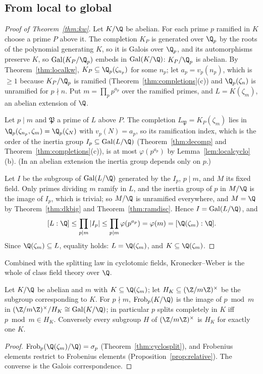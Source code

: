 \subsection*{From local to global}

\begin{proof}[Proof of Theorem~\ref{thm:kw}]
Let $K/\Q$ be abelian. For each prime $p$ ramified in $K$ choose a prime $P$ above it. The completion $K_P$ is generated over $\Q_p$ by the roots of the
polynomial generating $K$, so it is Galois over $\Q_p$, and its automorphisms preserve $K$, so $\operatorname{Gal}(K_P/\Q_p)$ embeds in
$\operatorname{Gal}(K/\Q)$: $K_P/\Q_p$ is abelian. By Theorem~\ref{thm:localkw}, $K_P\subseteq\Q_p(\zeta_{n_p})$ for some $n_p$; let $a_p=v_p(n_p)$, which is
$\ge1$ because $K_P/\Q_p$ is ramified (Theorem~\ref{thm:completions}(c)) and $\Q_p(\zeta_n)$ is unramified for $p\nmid n$. Put $m=\prod_pp^{a_p}$ over the
ramified primes, and $L=K(\zeta_m)$, an abelian extension of $\Q$.

Let $p\mid m$ and $\mathfrak P$ a prime of $L$ above $P$. The completion $L_{\mathfrak P}=K_P(\zeta_m)$ lies in $\Q_p(\zeta_{n_p},\zeta_m)=\Q_p(\zeta_N)$ with
$v_p(N)=a_p$, so its ramification index, which is the order of the inertia group $I_p\subseteq\operatorname{Gal}(L/\Q)$ (Theorem~\ref{thm:decomp} and
Theorem~\ref{thm:completions}(c)), is at most $\varphi(p^{a_p})$ by Lemma~\ref{lem:localcyclo}(b). (In an abelian extension the inertia group depends
only on $p$.)

Let $I$ be the subgroup of $\operatorname{Gal}(L/\Q)$ generated by the $I_p$, $p\mid m$, and $M$ its fixed field. Only primes dividing $m$ ramify in $L$, and the
inertia group of $p$ in $M/\Q$ is the image of $I_p$, which is trivial; so $M/\Q$ is unramified everywhere, and $M=\Q$ by Theorem~\ref{thm:dkbig} and
Theorem~\ref{thm:ramdisc}. Hence $I=\operatorname{Gal}(L/\Q)$, and
\[
[L:\Q]\le\prod_{p\mid m}|I_p|\le\prod_{p\mid m}\varphi(p^{a_p})=\varphi(m)=[\Q(\zeta_m):\Q].
\]
Since $\Q(\zeta_m)\subseteq L$, equality holds: $L=\Q(\zeta_m)$, and $K\subseteq\Q(\zeta_m)$.
\end{proof}

Combined with the splitting law in cyclotomic fields, Kronecker--Weber is the whole of class field theory over $\Q$.

\begin{corollary}\label{cor:cftQ}
Let $K/\Q$ be abelian and $m$ with $K\subseteq\Q(\zeta_m)$; let $H_K\subseteq(\Z/m\Z)^\times$ be the subgroup corresponding to $K$. For $p\nmid m$,
$\operatorname{Frob}_p(K/\Q)$ is the image of $p\bmod m$ in $(\Z/m\Z)^\times/H_K\cong\operatorname{Gal}(K/\Q)$; in particular $p$ splits completely in $K$ iff
$p\bmod m\in H_K$. Conversely every subgroup $H$ of $(\Z/m\Z)^\times$ is $H_K$ for exactly one $K$.
\end{corollary}
\begin{proof}
$\operatorname{Frob}_p(\Q(\zeta_m)/\Q)=\sigma_p$ (Theorem~\ref{thm:cyclosplit}), and Frobenius elements restrict to Frobenius elements
(Proposition~\ref{prop:relative}). The converse is the Galois correspondence.
\end{proof}

